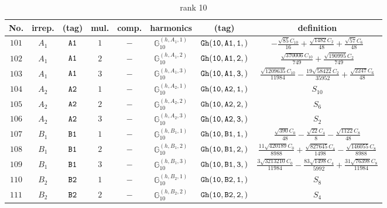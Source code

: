 \documentclass[fleqn,8pt]{jsarticle}
\begin{document}
\begin{table}[ht!]
\begin{center}
\caption{rank 10}
\renewcommand{\arraystretch}{1.3}
\begin{tabular}{cccccccc} \hline \hline
No. & irrep. & (tag) & mul. & comp. & harmonics & (tag) & definition \\ \hline
$ 101 $ & $ A_{1} $ & $ {\tt A1} $ & $ 1 $ & $ - $ & $ \mathbb{G}_{10}^{(h,A_{1},1)} $ & $ {\tt Gh(10,A1,1,)} $ & $ - \frac{\sqrt{85} C_{10}}{16} + \frac{\sqrt{1482} C_{2}}{48} + \frac{\sqrt{57} C_{6}}{48} $ \\
$ 102 $ & $ A_{1} $ & $ {\tt A1} $ & $ 2 $ & $ - $ & $ \mathbb{G}_{10}^{(h,A_{1},2)} $ & $ {\tt Gh(10,A1,2,)} $ & $ \frac{\sqrt{370006} C_{10}}{749} + \frac{\sqrt{190995} C_{2}}{749} $ \\
$ 103 $ & $ A_{1} $ & $ {\tt A1} $ & $ 3 $ & $ - $ & $ \mathbb{G}_{10}^{(h,A_{1},3)} $ & $ {\tt Gh(10,A1,3,)} $ & $ \frac{\sqrt{1209635} C_{10}}{11984} - \frac{19 \sqrt{58422} C_{2}}{35952} + \frac{\sqrt{2247} C_{6}}{48} $ \\
$ 104 $ & $ A_{2} $ & $ {\tt A2} $ & $ 1 $ & $ - $ & $ \mathbb{G}_{10}^{(h,A_{2},1)} $ & $ {\tt Gh(10,A2,1,)} $ & $ S_{10} $ \\
$ 105 $ & $ A_{2} $ & $ {\tt A2} $ & $ 2 $ & $ - $ & $ \mathbb{G}_{10}^{(h,A_{2},2)} $ & $ {\tt Gh(10,A2,2,)} $ & $ S_{6} $ \\
$ 106 $ & $ A_{2} $ & $ {\tt A2} $ & $ 3 $ & $ - $ & $ \mathbb{G}_{10}^{(h,A_{2},3)} $ & $ {\tt Gh(10,A2,3,)} $ & $ S_{2} $ \\
$ 107 $ & $ B_{1} $ & $ {\tt B1} $ & $ 1 $ & $ - $ & $ \mathbb{G}_{10}^{(h,B_{1},1)} $ & $ {\tt Gh(10,B1,1,)} $ & $ \frac{\sqrt{390} C_{0}}{48} - \frac{\sqrt{22} C_{4}}{8} - \frac{\sqrt{1122} C_{8}}{48} $ \\
$ 108 $ & $ B_{1} $ & $ {\tt B1} $ & $ 2 $ & $ - $ & $ \mathbb{G}_{10}^{(h,B_{1},2)} $ & $ {\tt Gh(10,B1,2,)} $ & $ \frac{11 \sqrt{420189} C_{0}}{8988} + \frac{\sqrt{827645} C_{4}}{1498} - \frac{\sqrt{146055} C_{8}}{8988} $ \\
$ 109 $ & $ B_{1} $ & $ {\tt B1} $ & $ 3 $ & $ - $ & $ \mathbb{G}_{10}^{(h,B_{1},3)} $ & $ {\tt Gh(10,B1,3,)} $ & $ \frac{3 \sqrt{3213210} C_{0}}{11984} - \frac{83 \sqrt{1498} C_{4}}{5992} + \frac{31 \sqrt{76398} C_{8}}{11984} $ \\
$ 110 $ & $ B_{2} $ & $ {\tt B2} $ & $ 1 $ & $ - $ & $ \mathbb{G}_{10}^{(h,B_{2},1)} $ & $ {\tt Gh(10,B2,1,)} $ & $ S_{8} $ \\
$ 111 $ & $ B_{2} $ & $ {\tt B2} $ & $ 2 $ & $ - $ & $ \mathbb{G}_{10}^{(h,B_{2},2)} $ & $ {\tt Gh(10,B2,2,)} $ & $ S_{4} $ \\

\end{tabular}
\end{center}
\end{table}
\end{document}
